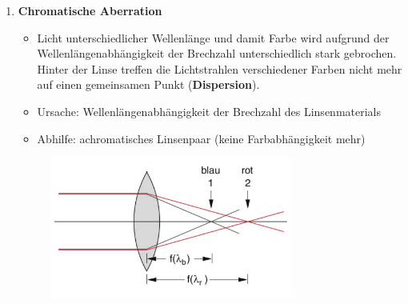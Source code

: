 \documentclass[a4paper, 11pt, ngerman, parskip=half-]{scrartcl}
\begin{document}
\begin{enumerate}
    \item \textbf{Chromatische Aberration}
          \begin{itemize}
              \item Licht unterschiedlicher Wellenlänge und damit Farbe wird aufgrund der Wellenlängenabhängigkeit der Brechzahl
                    unterschiedlich stark gebrochen. Hinter der Linse treffen die Lichtstrahlen verschiedener Farben nicht mehr auf
                    einen gemeinsamen Punkt (\textbf{Dispersion}).
              \item Ursache: Wellenlängenabhängigkeit der Brechzahl des Linsenmaterials
              \item Abhilfe: achromatisches Linsenpaar (keine Farbabhängigkeit mehr)
          \end{itemize}

          \begin{figure}[H]
              \centering
              \includegraphics[width=8cm]{image/18/fehler_chromatisch.png}
          \end{figure}


\end{enumerate}
\end{document}
